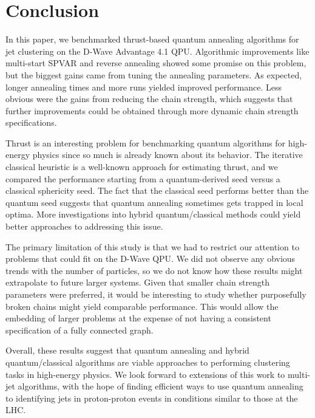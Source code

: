 \documentclass[aps,prd,twocolumn,superscriptaddress,preprintnumbers,nofootinbib,longbibliography,floatfix]{revtex4-1}
\begin{document}
\section{Conclusion}
\label{sec:conclusion}


In this paper, we benchmarked thrust-based quantum annealing algorithms for jet clustering on the D-Wave Advantage 4.1 QPU.
%
Algorithmic improvements like multi-start SPVAR and reverse annealing showed some promise on this problem, but the biggest gains came from tuning the annealing parameters.
%
As expected, longer annealing times and more runs yielded improved performance.
%
Less obvious were the gains from reducing the chain strength, which suggests that further improvements could be obtained through more dynamic chain strength specifications.


Thrust is an interesting problem for benchmarking quantum algorithms for high-energy physics since so much is already known about its behavior.
%
The iterative classical heuristic is a well-known approach for estimating thrust, and we compared the performance starting from a quantum-derived seed versus a classical sphericity seed.
%
The fact that the classical seed performs better than the quantum seed suggests that quantum annealing sometimes gets trapped in local optima.
%
More investigations into hybrid quantum/classical methods could yield better approaches to addressing this issue.


The primary limitation of this study is that we had to restrict our attention to problems that could fit on the D-Wave QPU.
%
We did not observe any obvious trends with the number of particles, so we do not know how these results might extrapolate to future larger systems.
%
Given that smaller chain strength parameters were preferred, it would be interesting to study whether purposefully broken chains might yield comparable performance.
%
This would allow the embedding of larger problems at the expense of not having a consistent specification of a fully connected graph.


Overall, these results suggest that quantum annealing and hybrid quantum/classical algorithms are viable approaches to performing clustering tasks in high-energy physics.
%
We look forward to extensions of this work to multi-jet algorithms, with the hope of finding efficient ways to use quantum annealing to identifying jets in proton-proton events in conditions similar to those at the LHC.
\end{document}
